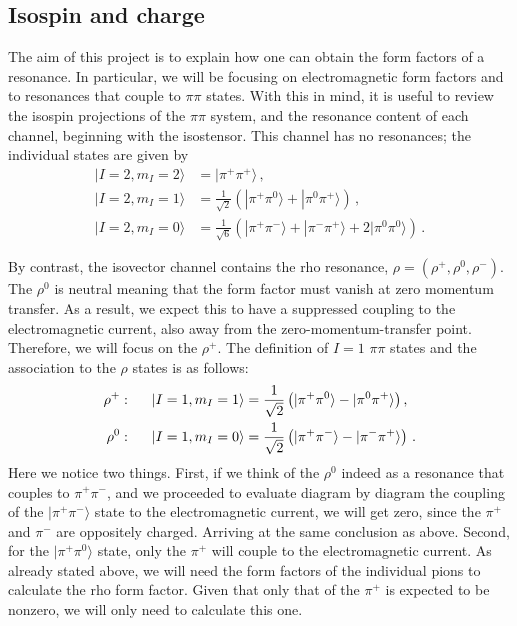 \subsection{Isospin and charge}

The aim of this project is to explain how one can obtain the form factors of a resonance. In particular, we will be focusing on electromagnetic form factors and to resonances that couple to $\pi\pi$ states. With this in mind, it is useful to review the isospin projections of the $\pi\pi$ system, and the resonance content of each channel, beginning with the isostensor. This channel has no resonances; the individual states are given by
\begin{align}
|I=2,m_I=2\rangle&=|\pi^+\pi^+\rangle \,,\\
|I=2,m_I=1\rangle&=\frac{1}{\sqrt{2}}\left(|\pi^+\pi^0\rangle+|\pi^0\pi^+\rangle\right) \,,\\
|I=2,m_I=0\rangle&=\frac{1}{\sqrt{6}}\left(|\pi^+\pi^-\rangle+|\pi^-\pi^+\rangle+2|\pi^0\pi^0\rangle\right) \,.
\end{align}

By contrast, the isovector channel contains the rho resonance, $\rho=(\rho^+,\rho^0,\rho^-)$. {\mh The $\rho^0$ is neutral meaning that the form factor must vanish at zero momentum transfer. As a result, we expect this to have a suppressed coupling to the electromagnetic current, also away from the zero-momentum-transfer point.} Therefore, we will focus on the $\rho^+$. The definition of $I=1$ $\pi\pi$ states and the association to the $\rho$ states is as follows:
\begin{align}
\rho^+:\hspace{.5cm}|I=1,m_I=1\rangle&=\frac{1}{\sqrt{2}}\left(|\pi^+\pi^0\rangle-|\pi^0\pi^+\rangle\right),\\
\rho^0:\hspace{.5cm}|I=1,m_I=0\rangle&=\frac{1}{\sqrt{2}}\left(|\pi^+\pi^-\rangle-|\pi^-\pi^+\rangle\right) \,.
\end{align}
Here we notice two things. First, if we think of the $\rho^0$ indeed as a resonance that couples to $\pi^+\pi^-$, and we proceeded to evaluate diagram by diagram the coupling of the $|\pi^+\pi^-\rangle$ state to the electromagnetic current, we will get zero, since the $\pi^+$ and $\pi^-$ are oppositely charged. Arriving at the same conclusion as above. Second, for the $|\pi^+\pi^0\rangle$ state, only the $\pi^+$ will couple to the electromagnetic current. As already stated above, we will need the form factors of the individual pions to calculate the rho form factor. Given that only that of the $\pi^+$ is expected to be nonzero, we will only need to calculate this one. 
{\mh [I don't think I'm happy with these comments. First I'm not sure one can diagramatically separate the coupling to $\pi^+$ and $\pi^-$ and make them cancel. Second, both in the context of the $\rho^0$ and the $\pi^0$, the vanishing only holds at $Q^2=0$. Thus for nonzero $Q^2$ the $\rho^0$ should give a nonzero result, so that the individual pions had better not cancel. Similarly I think we will have to calculate the $\pi^0$ form factor to get the full result... or just argue that neglecting it is a numerically good approximation.]}


